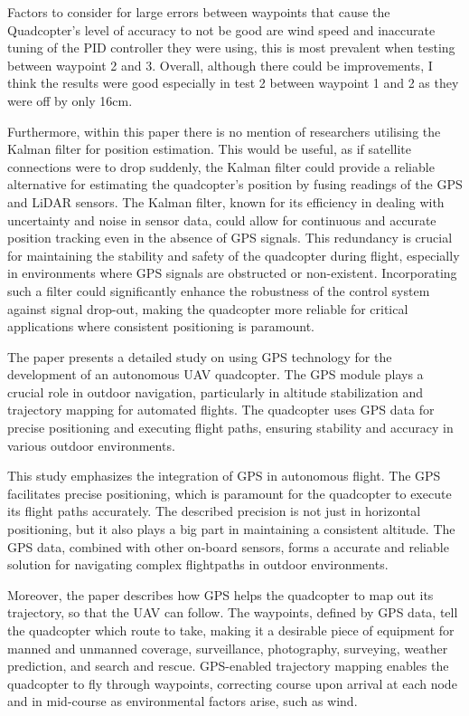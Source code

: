 \documentclass{article}
\begin{document}
Factors to consider for large errors between waypoints that cause the
Quadcopter's level of accuracy to not be good are wind speed and inaccurate
tuning of the PID controller they were using, this is most prevalent when
testing between waypoint 2 and 3. Overall, although there could be improvements,
I think the results were good especially in test 2 between waypoint 1 and 2 as
they were off by only 16cm.

Furthermore, within this paper there is no mention of researchers utilising the
Kalman filter for position estimation. This would be useful, as if satellite
connections were to drop suddenly, the Kalman filter could provide a reliable
alternative for estimating the quadcopter's position by fusing readings of the
GPS and LiDAR sensors. The Kalman filter, known for its efficiency in dealing
with uncertainty and noise in sensor data, could allow for continuous and
accurate position tracking even in the absence of GPS signals. This redundancy
is crucial for maintaining the stability and safety of the quadcopter during
flight, especially in environments where GPS signals are obstructed or
non-existent. Incorporating such a filter could significantly enhance the
robustness of the control system against signal drop-out, making the quadcopter
more reliable for critical applications where consistent positioning is
paramount.

The paper presents a detailed study on using GPS technology for the development
of an autonomous UAV quadcopter. The GPS module plays a crucial role in outdoor
navigation, particularly in altitude stabilization and trajectory mapping for
automated flights. The quadcopter uses GPS data for precise positioning and
executing flight paths, ensuring stability and accuracy in various outdoor
environments.

This study \cite{AkademiaBaru2016} emphasizes the integration of GPS in
autonomous flight. The GPS facilitates precise positioning, which is paramount
for the quadcopter to execute its flight paths accurately. The described
precision is not just in horizontal positioning, but it also plays a big part in
maintaining a consistent altitude. The GPS data, combined with other on-board
sensors, forms a accurate and reliable solution for navigating complex
flightpaths in outdoor environments.

Moreover, the paper describes how GPS helps the quadcopter to map out its
trajectory, so that the UAV can follow. The waypoints, defined by GPS data, tell
the quadcopter which route to take, making it a desirable piece of equipment for
manned and unmanned coverage, surveillance, photography, surveying, weather
prediction, and search and rescue. GPS-enabled trajectory mapping enables the
quadcopter to fly through waypoints, correcting course upon arrival at each node
and in mid-course as environmental factors arise, such as wind.
\end{document}
